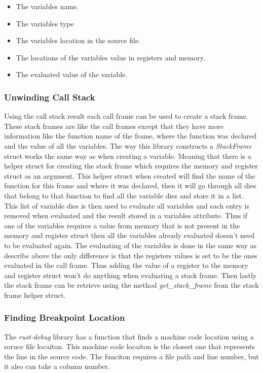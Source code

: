 \begin{itemize}
  \item The variables name.
  \item The variables type
  \item The variables location in the source file.
  \item The locations of the variables value in registers and memory.
  \item The evaluated value of the variable.
\end{itemize}


\subsubsection{Unwinding Call Stack}


Using the call stack result each call frame can be used to create a stack frame.
These stack frames are like the call frames except that they have more information like the function name of the frame, where the function was declared and the value of all the variables.
The way this library  constructs a \emph{StackFrame} struct works the same way as when creating a variable.
Meaning that there is a helper struct for creating the stack frame which requires the memory and register struct as an argument.
This helper struct when created will find the name of the function for this frame and where it was declared, then it will go through all dies that belong to that function to find all the variable dies and store it in a list.
This list of variable dies is then used to evaluate all variables and each entry is removed when evaluated and the result stored in a variables attribute.
Thus if one of the variables requires a value from memory that is not present in the memory and register struct then all the variables already evaluated doesn't need to be evaluated again.
The evaluating of the variables is done in the same way as describe above the only difference is that the registers values is set to be the ones evaluated in the call frame.
Thus adding the value of a register to the memory and register struct won't do anything when evaluating a stack frame.
Then lastly the stack frame can be retrieve using the method \emph{get\_stack\_frame} from the stack frame helper struct.


\subsubsection{Finding Breakpoint Location}
The \emph{rust-debug} library has a function that finds a machine code location using a soruce file locaiton.
This machine code locaiton is the closest one that represents the line in the source code.
The funciton requires a file path and line number, but it also can take a column number.


